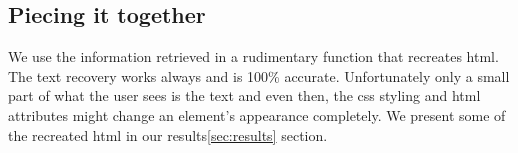 \subsection{Piecing it together}
We use the information retrieved in a rudimentary function that recreates html. The text recovery works always and is 100\% accurate. Unfortunately only a small part of what the user sees is the text and even then, the css styling and html attributes might change an element's appearance completely. We present some of the recreated html in our results\ref{sec:results} section.
